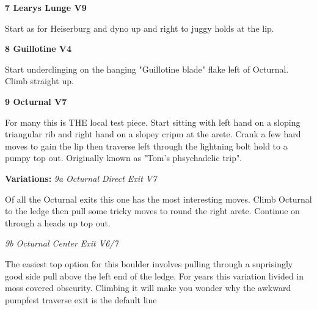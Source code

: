 \begin{multicols*}{2}
					\label{rt:Learys Lunge}\colorbox{Goldenrod!50}{\textbf{7 Learys Lunge V9 \ding{72}    }}
					\begin{adjustwidth}{0.5cm}{}
					\begin{minipage}{\linewidth}					
					Start as for Heiserburg and dyno up and right to juggy holds at the lip.
					\end{minipage}
					\end{adjustwidth}
					\label{rt:Guillotine}\colorbox{RoyalBlue!20}{\textbf{8 Guillotine V4    }}
					\begin{adjustwidth}{0.5cm}{}
					\begin{minipage}{\linewidth}					
					Start underclinging on the hanging "Guillotine blade" flake left of Octurnal. Climb straight up.
					\end{minipage}
					\end{adjustwidth}
					\label{rt:Octurnal}\colorbox{Goldenrod!50}{\textbf{9 Octurnal V7     }}
					\begin{adjustwidth}{0.5cm}{}
					\begin{minipage}{\linewidth}					
					For many this is THE local test piece. Start sitting with left hand on a sloping triangular rib and right hand on a slopey cripm at the arete. Crank a few hard moves to gain the lip then traverse left through the lightning bolt hold to a pumpy top out. Originally known as "Tom's phsychadelic trip".
					\end{minipage}
						\newline \textbf{Variations:} \newline
							\label{vr:Octurnal Direct Exit}\colorbox{Goldenrod!50}{\emph{9a Octurnal Direct Exit V7 \ding{72} \ding{72}   }}
							\begin{adjustwidth}{0.5cm}{}
							\begin{minipage}{\linewidth}					
							Of all the Octurnal exits this one has the most interesting moves. Climb Octurnal to the ledge then pull some tricky moves to round the right arete. Continue on through a heads up top out.
							\end{minipage}
							\end{adjustwidth}
							\label{vr:Octurnal Center Exit}\colorbox{Goldenrod!50}{\emph{9b Octurnal Center Exit V6/7    }}
							\begin{adjustwidth}{0.5cm}{}
							\begin{minipage}{\linewidth}					
							The easiest top option for this boulder involves pulling through a suprisingly good side pull above the left end of the ledge. For years this variation livided in moss covered obscurity. Climbing it will make you wonder why the awkward pumpfest traverse exit is the default line
							\end{minipage}
							\end{adjustwidth}
					\end{adjustwidth}


\end{multicols*}
